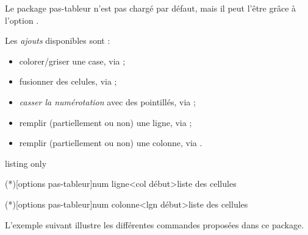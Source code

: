 \documentclass[french,11pt,a4paper]{article}
\begin{document}
\smallskip

Le package \textsf{pas-tableur} n'est pas chargé par défaut, mais il peut l'être grâce à l'option \MontreCode{[pastableur]}.

\smallskip

Les \textit{ajouts} disponibles sont :

\begin{itemize}
	\item colorer/griser une case, via  ;
	\item fusionner des celules, via  ;
	\item \textit{casser la numérotation} avec des pointillés, via  ;
	\item remplir (partiellement ou non) une ligne,  via  ;
	\item remplir (partiellement ou non) une colonne,  via .
\end{itemize}

\begin{DemoCode}{listing only}
\usepackage[pastableur]{customenvs}




\lignetxt(*)[options pas-tableur]{num ligne}<col début>{liste des cellules}

\colonnetxt(*)[options pas-tableur]{num colonne}<lgn début>{liste des cellules}
\end{DemoCode}

\pagebreak

L'exemple suivant illustre les différentes commandes proposées dans ce package.

\begin{DemoCode}{}
\end{DemoCode}
\end{document}
